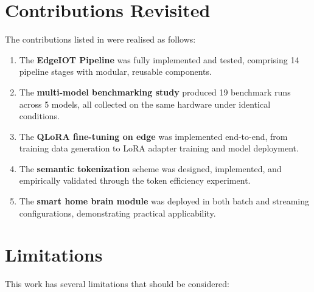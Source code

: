 \documentclass[12pt,a4paper,oneside]{report}
\begin{document}
\section{Contributions Revisited}
\label{sec:conc-contributions}

The contributions listed in  were realised as follows:

\begin{enumerate}
    \item The \textbf{EdgeIOT Pipeline} was fully implemented and tested, comprising 14 pipeline stages with modular, reusable components.
    \item The \textbf{multi-model benchmarking study} produced 19 benchmark runs across 5 models, all collected on the same hardware under identical conditions.
    \item The \textbf{QLoRA fine-tuning on edge} was implemented end-to-end, from training data generation to LoRA adapter training and model deployment.
    \item The \textbf{semantic tokenization} scheme was designed, implemented, and empirically validated through the token efficiency experiment.
    \item The \textbf{smart home brain module} was deployed in both batch and streaming configurations, demonstrating practical applicability.
\end{enumerate}


\section{Limitations}
\label{sec:conc-limitations}

This work has several limitations that should be considered:
\end{document}
